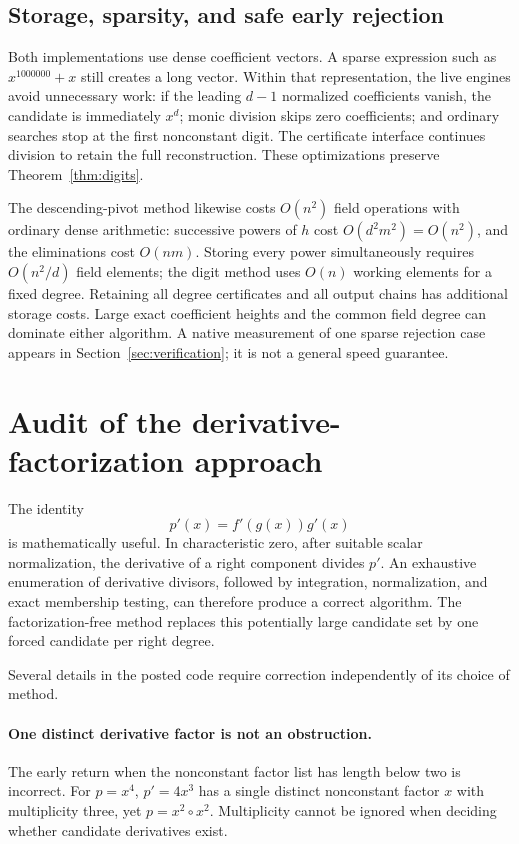 \documentclass[11pt,a4paper]{article}
\numberwithin{equation}{section}
\theoremstyle{definition}
\theoremstyle{remark}
\begin{document}
\subsection{Storage, sparsity, and safe early rejection}
Both implementations use dense coefficient vectors. A sparse expression such
as $x^{1000000}+x$ still creates a long vector. Within that representation,
the live engines avoid unnecessary work: if the leading $d-1$ normalized
coefficients vanish, the candidate is immediately $x^d$; monic division skips
zero coefficients; and ordinary searches stop at the first nonconstant digit.
The certificate interface continues division to retain the full
reconstruction. These optimizations preserve Theorem~\ref{thm:digits}.

The descending-pivot method likewise costs $O(n^2)$ field operations with
ordinary dense arithmetic: successive powers of $h$ cost
$O(d^2m^2)=O(n^2)$, and the eliminations cost $O(nm)$.
Storing every power simultaneously requires $O(n^2/d)$ field elements;
the digit method uses $O(n)$ working elements for a fixed degree.
Retaining all degree certificates and all output chains has additional
storage costs. Large exact coefficient heights and the common field degree
can dominate either algorithm. A native measurement of one sparse rejection
case appears in Section~\ref{sec:verification}; it is not a general speed guarantee.

\section{Audit of the derivative-factorization approach}
\label{sec:audit}
The identity
\[
 p'(x)=f'(g(x))g'(x)
\]
is mathematically useful. In characteristic zero, after suitable scalar
normalization, the derivative of a right component divides $p'$. An exhaustive
enumeration of derivative divisors, followed by integration, normalization,
and exact membership testing, can therefore produce a correct algorithm.
The factorization-free method replaces this potentially large candidate set
by one forced candidate per right degree.

Several details in the posted code require correction independently of its
choice of method.

\paragraph{One distinct derivative factor is not an obstruction.}
The early return when the nonconstant factor list has length below two is
incorrect. For $p=x^4$, $p'=4x^3$ has a single distinct nonconstant factor
$x$ with multiplicity three, yet $p=x^2\circ x^2$. Multiplicity cannot be
ignored when deciding whether candidate derivatives exist.
\end{document}
